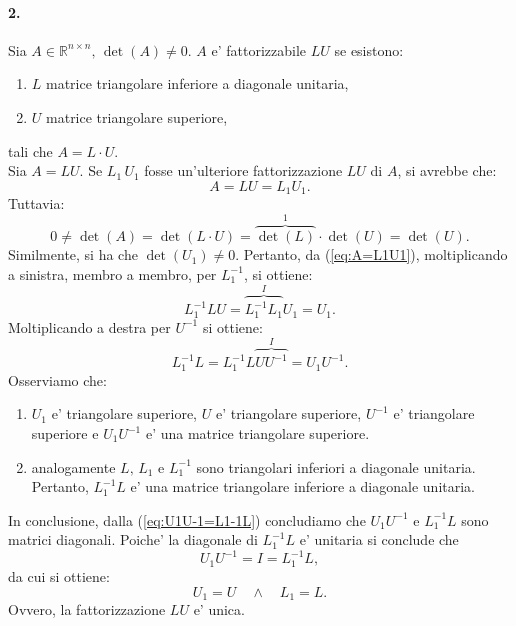 \paragraph{2.} Sia $A\in\mathbb{R}^{n \times n},\, \det(A)\neq 0$. $A$ e' fattorizzabile $LU$ se esistono:
\begin{enumerate}
	\item $L$ matrice triangolare inferiore a diagonale unitaria,
	\item $U$ matrice triangolare superiore,
\end{enumerate}
tali che $A=L\cdot U$.\\
Sia $A=LU$. Se $L_1\, U_1$ fosse un'ulteriore fattorizzazione $LU$ di $A$, si avrebbe che:
\begin{equation}\label{eq:A=L1U1}
	A=LU=L_1U_1.
\end{equation}
Tuttavia:
\begin{equation*}
	0 \neq \det(A) = \det(L\cdot U) = \overbrace{\det(L)}^{1}\cdot\det(U) = \det(U).
\end{equation*}
Similmente, si ha che $\det(U_1)\neq 0$. Pertanto, da (\ref{eq:A=L1U1}), moltiplicando a sinistra, membro a membro, per $L_1^{-1}$, si ottiene:
\begin{equation*}
	L_1^{-1}LU=\overbrace{L_1^{-1}L_1}^{I}U_1 = U_1. 
\end{equation*}
Moltiplicando a destra per $U^{-1}$ si ottiene:
\begin{equation}\label{eq:U1U-1=L1-1L}
	L_1^{-1}L=L_1^{-1} L \overbrace{UU^{-1}}^{I}=U_1U^{-1}.
\end{equation}
Osserviamo che:
\begin{enumerate}
	\item $U_1$ e' triangolare superiore, $U$ e' triangolare superiore, $U^{-1}$ e' triangolare superiore e $U_1U^{-1}$ e' una matrice triangolare superiore.
	\item analogamente $L,\, L_1$ e $L_1^{-1}$ sono triangolari inferiori a diagonale unitaria. Pertanto, $L_1^{-1}L$ e' una matrice triangolare inferiore a diagonale unitaria.
\end{enumerate}
In conclusione, dalla (\ref{eq:U1U-1=L1-1L}) concludiamo che $U_1U^{-1}$ e $L_1^{-1}L$ sono matrici diagonali. Poiche' la diagonale di $L_1^{-1}L$ e' unitaria si conclude che
\begin{equation*}
	U_1U^{-1} = I = L_1^{-1}L,
\end{equation*}
da cui si ottiene:
\begin{equation*}
	U_1 = U \quad \wedge \quad L_1 = L.
\end{equation*}
Ovvero, la fattorizzazione $LU$ e' unica.

